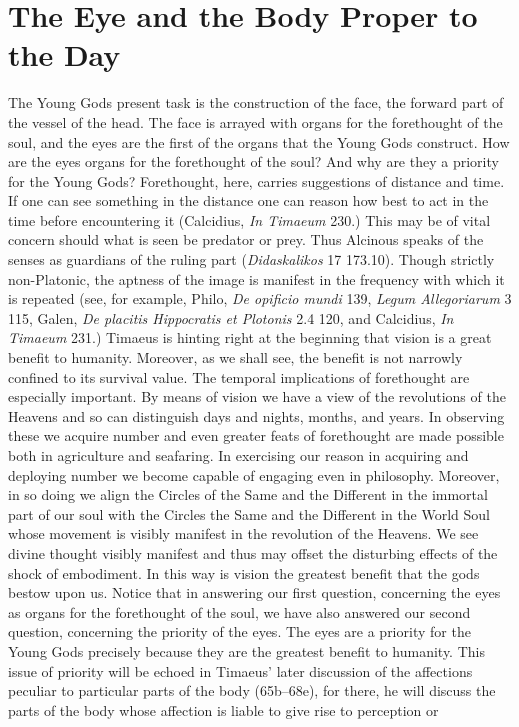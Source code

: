 

\section{The Eye and the Body Proper to the Day} %
\label{sec:the_eye_and_the_body_proper_to_the_day}

The Young Gods present task is the construction of the face, the forward part of the vessel of the head. The face is arrayed with organs for the forethought of the soul, and the eyes are the first of the organs that the Young Gods construct. How are the eyes organs for the forethought of the soul? And why are they a priority for the Young Gods? Forethought, here, carries suggestions of distance and time. If one can see something in the distance one can reason how best to act in the time before encountering it (Calcidius, \emph{In Timaeum} 230.) This may be of vital concern should what is seen be predator or prey. Thus Alcinous speaks of the senses as guardians of the ruling part (\emph{Didaskalikos} 17 173.10). Though strictly non-Platonic, the aptness of the image is manifest in the frequency with which it is repeated (see, for example, Philo, \emph{De opificio mundi} 139, \emph{Legum Allegoriarum} 3 115, Galen, \emph{De placitis Hippocratis et Plotonis} 2.4 120, and Calcidius, \emph{In Timaeum} 231.) Timaeus is hinting right at the beginning that vision is a great benefit to humanity. Moreover, as we shall see, the benefit is not narrowly confined to its survival value. The temporal implications of forethought are especially important. By means of vision we have a view of the revolutions of the Heavens and so can distinguish days and nights, months, and years. In observing these we acquire number and even greater feats of forethought are made possible both in agriculture and seafaring. In exercising our reason in acquiring and deploying number we become capable of engaging even in philosophy. Moreover, in so doing we align the Circles of the Same and the Different in the immortal part of our soul with the Circles the Same and the Different in the World Soul whose movement is visibly manifest in the revolution of the Heavens. We see divine thought visibly manifest and thus may offset the disturbing effects of the shock of embodiment. In this way is vision the greatest benefit that the gods bestow upon us. Notice that in answering our first question, concerning the eyes as organs for the forethought of the soul, we have also answered our second question, concerning the priority of the eyes. The eyes are a priority for the Young Gods precisely because they are the greatest benefit to humanity. This issue of priority will be echoed in Timaeus' later discussion of the affections peculiar to particular parts of the body (65b–68e), for there, he will discuss the parts of the body whose affection is liable to give rise to perception or 